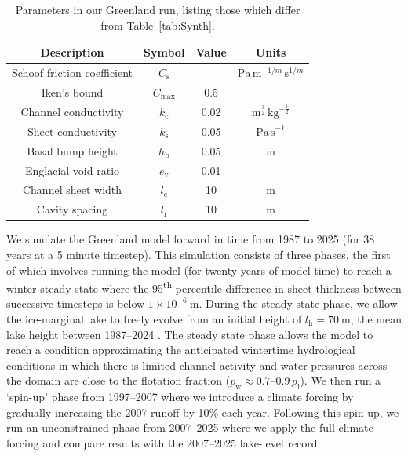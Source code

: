 \documentclass[tc, manuscript]{copernicus}
\begin{document}
\begin{table}[t]
\caption{Parameters in our Greenland run, listing those which differ from Table~\ref{tab:Synth}.}
\label{tab:Greenland}
\begin{tabular}{@{}cccc}
\hline
Description & Symbol & Value & Units \\
\hline
Schoof friction coefficient & $C_{\mathrm{s}}$ & & $\mathrm{Pa} \, \mathrm{m}^{-1/m}\,\mathrm{s}^{1/m}$ \\
Iken's bound & $C_{\mathrm{max}}$ & 0.5 & \\
Channel conductivity & $k_{\mathrm{c}}$ & 0.02 & $\mathrm{m}^{\frac{3}{2}}\, \mathrm{kg}^{-\frac{1}{2}}$ \\
Sheet conductivity & $k_{\mathrm{s}}$& 0.05 & $\mathrm{Pa\, s}^{-1}$ \\ 
Basal bump height & $h_{\mathrm{b}}$& 0.05 & m \\
Englacial void ratio & $e_{\mathrm{v}}$ & 0.01 & \\
Channel sheet width & $l_{\mathrm{c}}$& 10 & $\mathrm{m}$ \\
Cavity spacing & $l_{\mathrm{r}}$& 10 & $\mathrm{m}$ \\
\hline
\end{tabular}

\end{table}

We simulate the Greenland model forward in time from 1987 to 2025 (for 38 years at a 5 minute timestep). This simulation consists of three phases, the first of which involves running the model (for twenty years of model time) to reach a winter steady state where the 95\textsuperscript{th} percentile difference in sheet thickness between successive timesteps is below $1\times10^{-6}\ \mathrm{m}$. During the steady state phase, we allow the ice-marginal lake to freely evolve from an initial height of $l_{\mathrm{h}}=70\ \mathrm{m}$, the mean lake height between 1987--2024 \citep{livingstone2025ice}. The steady state phase allows the model to reach a condition approximating the anticipated wintertime hydrological conditions in which there is limited channel activity and water pressures across the domain are close to the flotation fraction ($p_{\mathrm{w}}\approx 0.7\text{--}0.9 \, p_{\mathrm{i}}$). We then run a `spin-up' phase from 1997--2007 where we introduce a climate forcing by gradually increasing the 2007 runoff by 10\% each year. Following this spin-up, we run an unconstrained phase from 2007--2025 where we apply the full climate forcing and compare results with the 2007--2025 lake-level record.
\end{document}

